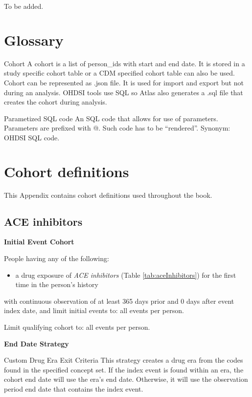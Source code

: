 \documentclass[11pt]{book}
\providecommand{\tightlist}{%
  \setlength{\itemsep}{0pt}\setlength{\parskip}{0pt}}
\theoremstyle{definition}
\theoremstyle{definition}
\theoremstyle{definition}
\theoremstyle{remark}
\begin{document}
To be added.

\hypertarget{appendix-appendix}{%
\appendix {}}


\hypertarget{Glossary}{%
\chapter{Glossary}\label{Glossary}}

Cohort
A cohort is a list of person\_ids with start and end date. It is stored in a study specific cohort table or a CDM specified cohort table can also be used. Cohort can be represented as .json file. It is used for import and export but not during an analysis. OHDSI tools use SQL so Atlas also generates a .sql file that creates the cohort during analysis.

Parametized SQL code
An SQL code that allows for use of parameters. Parameters are prefixed with @. Such code has to be ``rendered''. Synonym: OHDSI SQL code.

\hypertarget{CohortDefinitions}{%
\chapter{Cohort definitions}\label{CohortDefinitions}}

This Appendix contains cohort definitions used throughout the book.

\hypertarget{AceInhibitors}{%
\section{ACE inhibitors}\label{AceInhibitors}}

\textbf{Initial Event Cohort}

People having any of the following:

\begin{itemize}
\tightlist
\item
  a drug exposure of \emph{ACE inhibitors} (Table \ref{tab:aceInhibitors}) for the first time in the person's history
\end{itemize}

with continuous observation of at least 365 days prior and 0 days after event index date, and limit initial events to: all events per person.

Limit qualifying cohort to: all events per person.

\textbf{End Date Strategy}

Custom Drug Era Exit Criteria
This strategy creates a drug era from the codes found in the specified concept set. If the index event is found within an era, the cohort end date will use the era's end date. Otherwise, it will use the observation period end date that contains the index event.
\end{document}
